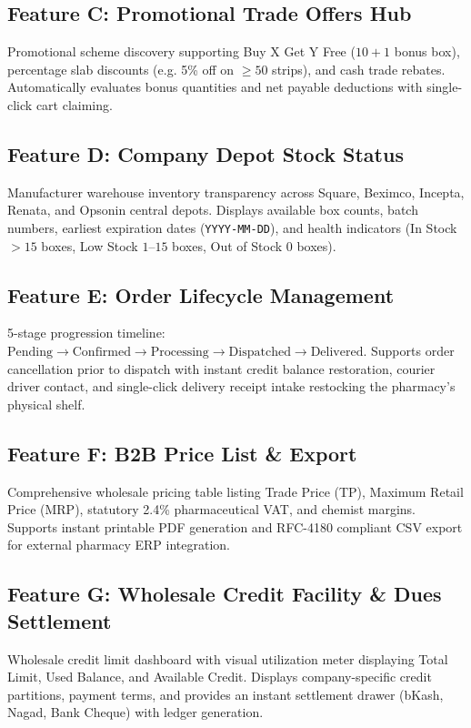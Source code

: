 \documentclass[10pt,a4paper]{article}
\begin{document}
\subsection{Feature C: Promotional Trade Offers Hub}
Promotional scheme discovery supporting Buy X Get Y Free ($10+1$ bonus box), percentage slab discounts (e.g. 5\% off on $\ge 50$ strips), and cash trade rebates. Automatically evaluates bonus quantities and net payable deductions with single-click cart claiming.

\subsection{Feature D: Company Depot Stock Status}
Manufacturer warehouse inventory transparency across Square, Beximco, Incepta, Renata, and Opsonin central depots. Displays available box counts, batch numbers, earliest expiration dates (\texttt{YYYY-MM-DD}), and health indicators (In Stock $>15$ boxes, Low Stock $1$--$15$ boxes, Out of Stock $0$ boxes).

\subsection{Feature E: Order Lifecycle Management}
5-stage progression timeline: $\text{Pending} \to \text{Confirmed} \to \text{Processing} \to \text{Dispatched} \to \text{Delivered}$. Supports order cancellation prior to dispatch with instant credit balance restoration, courier driver contact, and single-click delivery receipt intake restocking the pharmacy's physical shelf.

\subsection{Feature F: B2B Price List \& Export}
Comprehensive wholesale pricing table listing Trade Price (TP), Maximum Retail Price (MRP), statutory 2.4\% pharmaceutical VAT, and chemist margins. Supports instant printable PDF generation and RFC-4180 compliant CSV export for external pharmacy ERP integration.

\subsection{Feature G: Wholesale Credit Facility \& Dues Settlement}
Wholesale credit limit dashboard with visual utilization meter displaying Total Limit, Used Balance, and Available Credit. Displays company-specific credit partitions, payment terms, and provides an instant settlement drawer (bKash, Nagad, Bank Cheque) with ledger generation.
\end{document}
